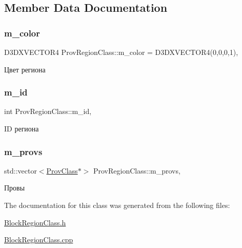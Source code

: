 \subsection{Member Data Documentation}
\mbox{\label{class_prov_region_class_a8782e9c8135dbf5f89f0b0b64649a129}} 
\subsubsection{\texorpdfstring{m\+\_\+color}{m\_color}}
{\footnotesize\ttfamily D3\+D\+X\+V\+E\+C\+T\+O\+R4 Prov\+Region\+Class\+::m\+\_\+color = D3\+D\+X\+V\+E\+C\+T\+O\+R4(0,0,0,1)\hspace{0.3cm}{\ttfamily [protected]}, {\ttfamily [inherited]}}



Цвет региона 

\mbox{\label{class_prov_region_class_a507b91b7ae0374d4e4b0816dc3dc0c62}} 
\subsubsection{\texorpdfstring{m\+\_\+id}{m\_id}}
{\footnotesize\ttfamily int Prov\+Region\+Class\+::m\+\_\+id\hspace{0.3cm}{\ttfamily [protected]}, {\ttfamily [inherited]}}



ID региона 

\mbox{\label{class_prov_region_class_a2597561e1bac7e8514c57e9db3620e17}} 
\subsubsection{\texorpdfstring{m\+\_\+provs}{m\_provs}}
{\footnotesize\ttfamily std\+::vector$<$\hyperlink{class_prov_class}{Prov\+Class}$\ast$$>$ Prov\+Region\+Class\+::m\+\_\+provs\hspace{0.3cm}{\ttfamily [protected]}, {\ttfamily [inherited]}}



Провы 



The documentation for this class was generated from the following files\+:\begin{DoxyCompactItemize}
\item 
\hyperlink{_block_region_class_8h}{Block\+Region\+Class.\+h}\item 
\hyperlink{_block_region_class_8cpp}{Block\+Region\+Class.\+cpp}\end{DoxyCompactItemize}
